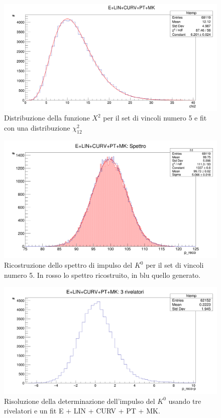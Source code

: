 \documentclass[8pt]{extarticle}
\begin{document}
\begin{figure}[h!]
	\begin{center}
		\includegraphics[scale=0.25]{set_5_chi2} 
		\caption{Distribuzione della funzione $X^2$ per il set di vincoli numero 5 e fit con una distribuzione $\chi^2_{12}$}
		\label{fig:set_5_chi2}
	\end{center}
\end{figure}

\begin{figure}[h!]
	\begin{center}
		\includegraphics[scale=0.25]{set_5_spettro} 
		\caption{Ricostruzione dello spettro di impulso del $K^0$ per il set di vincoli numero 5. In rosso lo spettro ricostruito, in blu quello generato.}
		\label{fig:set_5_spettro}
	\end{center}
\end{figure}

\begin{figure}[h!]
	\begin{center}
		\includegraphics[scale=0.25]{set_1det_p} 
		\caption{Risoluzione della determinazione dell'impulso del $K^0$ usando tre rivelatori e un fit E + LIN + CURV + PT + MK.}
		\label{fig:set_1det_p}
	\end{center}
\end{figure}
\end{document}
